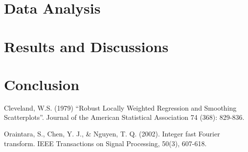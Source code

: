 \section{Data Analysis}

\section{Results and Discussions}

\section{Conclusion}



\begin{thebibliography}{1}
Cleveland, W.S. (1979) “Robust Locally Weighted Regression and Smoothing Scatterplots”. Journal of the American Statistical Association 74 (368): 829-836.

Oraintara, S., Chen, Y. J., \& Nguyen, T. Q. (2002). Integer fast Fourier transform. IEEE Transactions on Signal Processing, 50(3), 607-618.

\end{thebibliography}

